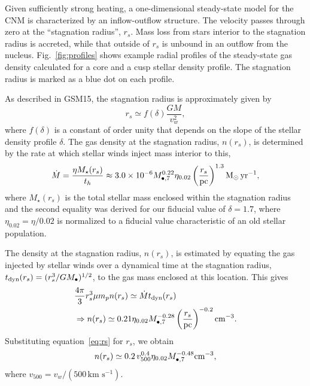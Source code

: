 \documentclass[usenatbib,fleqn]{mnras}
\newcommand{\Mbh}[1][]{M_{\bullet#1}}
\newcommand{\Msun}{{\rm M_\odot}}
\newcommand{\rs}{r_s}
\begin{document}
Given sufficiently strong heating, a one-dimensional steady-state model for the CNM is characterized by an inflow-outflow structure.  The velocity passes through zero at the ``stagnation radius'', $\rs$.  Mass loss from stars interior to the stagnation radius is accreted, while that outside of $\rs$ is unbound in an outflow from the nucleus.  Fig.~\ref{fig:profiles} shows example radial profiles of the steady-state gas density calculated for a core and a cusp stellar density profile. The stagnation radius is marked as a blue dot on each profile.

As described in GSM15, the stagnation radius is approximately given by
\begin{equation}
r_s \simeq f(\delta) \frac{G M}{v_w^2},
\label{eq:rs}
\end{equation}
where $f(\delta)$ is a constant of order unity that depends on the slope of the stellar density profile $\delta$.  The gas density at the stagnation radius, $n(\rs)$, is determined by the rate at which stellar winds inject mass  interior to this,
\begin{equation}
\dot{M}=\frac{\eta M_{\rm \star}(\rs)}{t_h} \approx  3.0 \times 10^{-6} \Mbh[,7]^{0.22} \eta_{0.02} \left(\frac{r_s}{\rm
  pc}\right)^{1.3} \Msun \, {\rm yr}^{-1},
\label{eq:dotM}
\end{equation}
where $M_{\star}(\rs)$ is the total stellar mass enclosed within the stagnation radius and the second equality was derived for our fiducial value of $\delta=1.7$, where $\eta_{0.02}=\eta/0.02$ is normalized to a fiducial value characteristic of an old stellar population.

The density at the stagnation radius, $n(\rs)$, is estimated by equating the gas injected by stellar winds over a dynamical time at the stagnation radius, $t_{\rm dyn} (\rs)=(\rs^3/G \Mbh)^{1/2}$, to the gas mass enclosed at this location.  This gives
\begin{align}
  &\frac{4 \pi}{3} \rs^3 \mu m_p n(r_s) \simeq \dot{M} t_{\rm dyn}
  (\rs) \nonumber\\
  &\Rightarrow n(r_s) \simeq 0.21 \eta_{0.02} \Mbh[,7]^{-0.28} \left(\frac{r_s}{\rm
      pc}\right)^{-0.2} {\rm cm}^{-3}.
\label{eq:nrs}
\end{align}
Substituting equation~\eqref{eq:rs} for $r_s$, we obtain 
\begin{equation}
n(r_s) \simeq 0.2 \, v_{500}^{0.4} \eta_{0.02} \Mbh[,7]^{-0.48} {\rm cm}^{-3},
\label{eq:nrs2}
\end{equation}
where $v_{500}=v_w/\left(500 \,\mathrm{km\,\,
    s^{-1}}\right)$. 
\end{document}
